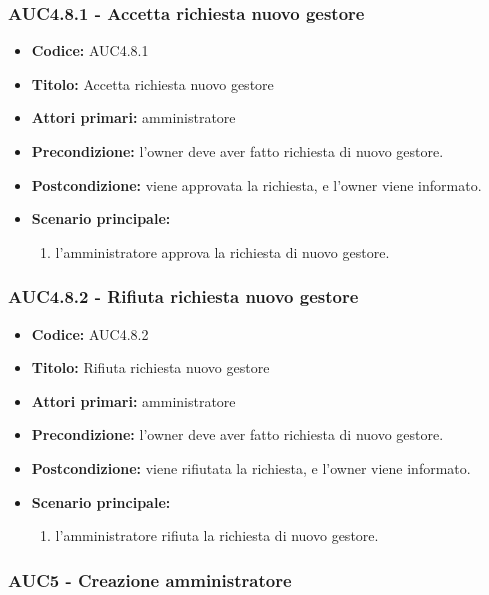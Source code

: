 \documentclass[casi-duso]{subfiles}
\begin{document}
\subsubsection{AUC4.8.1 - Accetta richiesta nuovo gestore}%
\label{subsub:AUC4.8.1}
\begin{itemize}
  \item \textbf{Codice:} AUC4.8.1
  \item \textbf{Titolo:} Accetta richiesta nuovo gestore
  \item \textbf{Attori primari:} amministratore
  \item \textbf{Precondizione:} l'owner deve aver fatto richiesta di nuovo gestore.
  \item \textbf{Postcondizione:} viene approvata la richiesta, e l'owner viene informato.
  \item \textbf{Scenario principale:}
  \begin{enumerate}
    \item l'amministratore approva la richiesta di nuovo gestore.
  \end{enumerate}
\end{itemize}  

\subsubsection{AUC4.8.2 - Rifiuta richiesta nuovo gestore}%
\label{subsub:AUC4.8.2}
\begin{itemize}
  \item \textbf{Codice:} AUC4.8.2
  \item \textbf{Titolo:} Rifiuta richiesta nuovo gestore
  \item \textbf{Attori primari:} amministratore
  \item \textbf{Precondizione:} l'owner deve aver fatto richiesta di nuovo gestore.
  \item \textbf{Postcondizione:} viene rifiutata la richiesta, e l'owner viene informato.
  \item \textbf{Scenario principale:}
  \begin{enumerate}
    \item l'amministratore rifiuta la richiesta di nuovo gestore.
  \end{enumerate}
\end{itemize}  

\subsubsection{AUC5 - Creazione amministratore}%
\label{subsub:AUC5}
\end{document}

